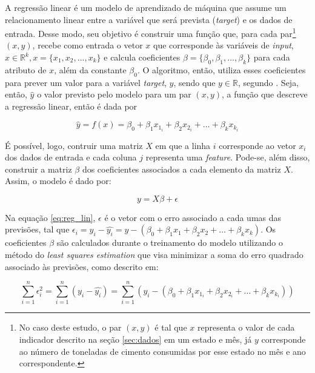A regressão linear é um modelo de aprendizado de máquina que assume um relacionamento
linear entre a variável que será prevista (\textit{target}) e os dados de entrada.
Desse modo, seu objetivo é construir uma 
função que, para cada par\footnote{No
caso deste estudo, o par  $(x,y)$ é tal que 
$x$ representa o valor de cada
indicador descrito na seção \ref{sec:dados} em um estado e mês, já 
$y$ corresponde ao número de toneladas de cimento consumidas
por esse estado no mês e ano correspondente.} $(x,y)$, recebe como
entrada o vetor $x$ que corresponde às variáveis de \textit{input},
$x \in \mathbb{R}^k , x=\{x_1, x_2, ..., x_k\}$ e calcula coeficientes
$\beta = \{\beta_0, \beta_1, \dots, \beta_k\}$ para cada atributo de $x$,
além da constante $\beta_0$. O algoritmo, então, utiliza esses coeficientes para
prever um valor para a variável \textit{target}, $y$, sendo 
que $y \in \mathbb{R}$, segundo \cite{forecasting}. Seja,
então, $\hat{y}$ o valor previsto pelo modelo para um 
par $(x, y)$, a função que descreve a 
regressão linear, então é dada por

\begin{equation}
  \hat{y} = f(x) = \beta_0 + \beta_1 x_{1_i} + \beta_2 x_{2_i} + \dots + \beta_k x_{k_i} 
\end{equation}

É possível, logo, contruir uma matriz $X$ em que a linha $i$
corresponde ao vetor $x_i$ dos dados de entrada e 
cada coluna $j$ representa uma \textit{feature}. Pode-se, 
além disso, construir a matriz $\beta$ dos coeficientes associados 
a cada elemento da matriz $X$. Assim, o modelo
é dado por:

\begin{equation}
  \label{eq:reg_lin}
  y = X\beta + \epsilon
\end{equation}

Na equação \ref{eq:reg_lin}, $\epsilon$ é o vetor com o erro associado a cada umas 
das previsões, tal que $\epsilon_i = y_i - \hat{y_i} = y - (\beta_0 + \beta_1 x_1 + \beta_2 x_2 + \dots + \beta_k x_k )$.
Os coeficientes $\beta$ são calculados durante o treinamento 
do modelo utilizando o método do \textit{least squares estimation}
que visa minimizar a soma do erro quadrado associado às previsões, 
como descrito em:

\begin{equation}
  \sum_{i=1}^{n} \epsilon_i^2 = \sum_{i=1}^{n} (y_i - \hat{y_i}) = 
  \sum_{i=1}^{n} (y_i - (\beta_0 + \beta_1 x_{1_i} + \beta_2 x_{2_i} + \dots + \beta_k x_{k_i} ))
\end{equation}

